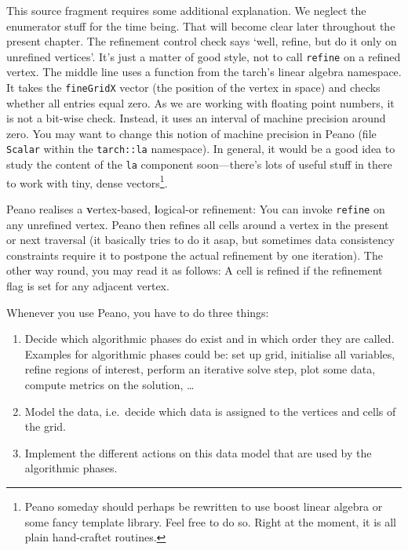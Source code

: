 \noindent
This source fragment requires some additional explanation. 
We neglect the enumerator stuff for the time being.
That will become clear later throughout the present chapter.
The refinement control check says `well, refine, but do it only on unrefined
vertices'.
It's just a matter of good style, not to call \texttt{refine} on a refined
vertex.
The middle line uses a function from the tarch's linear algebra namespace. 
It takes the \texttt{fineGridX} vector (the position of the vertex in space) and
checks whether all entries equal zero.
As we are working with floating point numbers, it is not a bit-wise check. 
Instead, it uses an interval of machine precision around zero.
You may want to change this notion of machine precision in Peano (file
\texttt{Scalar} within the \texttt{tarch::la} namespace). 
In general, it would be a good idea to study the content of the \texttt{la}
component soon---there's lots of useful stuff in there to work with
tiny, dense vectors\footnote{Peano someday should perhaps be rewritten to use
boost linear algebra or some fancy template library. Feel free to do so. Right
at the moment, it is all plain hand-craftet routines.}.

\begin{remark}
  Peano realises a {\textbf vertex-based}, {\textbf logical-or} refinement: You can
  invoke \texttt{refine} on any unrefined vertex. Peano then refines all cells
  around a vertex in the present or next traversal (it basically tries to do it
  asap, but sometimes data consistency constraints require it to postpone the
  actual refinement by one iteration). The other way round, you may read it as
  follows: A cell is refined if the refinement flag is set for any adjacent
  vertex.
\end{remark}


Whenever you use Peano, you have to do three things:
\begin{enumerate}
  \item Decide which algorithmic phases do exist and in which order they are
  called. Examples for algorithmic phases could be: set up grid, initialise all
  variables, refine regions of interest, perform an iterative solve step, plot
  some data, compute metrics on the solution, \ldots
  \item Model the data, i.e.~decide which data is assigned to the vertices and
  cells of the grid.
  \item Implement the different actions on this data model that are used by the
  algorithmic phases.
\end{enumerate}

